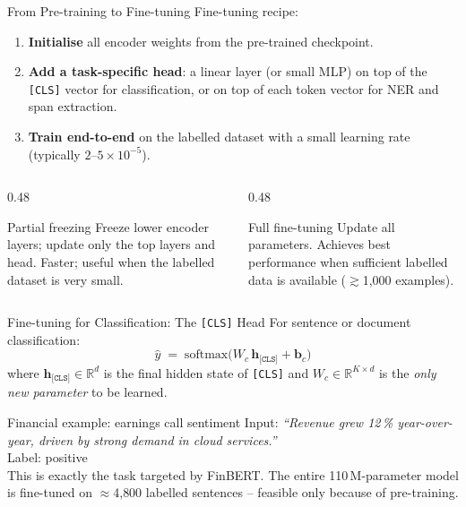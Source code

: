 \documentclass[11pt,aspectratio=169,professionalfonts]{beamer}
\begin{document}
\begin{frame}{From Pre-training to Fine-tuning}
  Fine-tuning recipe:
  \begin{enumerate}
    \item \textbf{Initialise} all encoder weights from the pre-trained checkpoint.
    \item \textbf{Add a task-specific head}: a linear layer (or small MLP)
          on top of the \texttt{[CLS]} vector for classification,
          or on top of each token vector for NER and span extraction.
    \item \textbf{Train end-to-end} on the labelled dataset with a
          small learning rate (typically $2$--$5\times10^{-5}$).
  \end{enumerate}

  \begin{columns}[T]
    \begin{column}{0.48\linewidth}
      \begin{block}{Partial freezing}
        Freeze lower encoder layers; update only the top layers and head.
        Faster; useful when the labelled dataset is very small.
      \end{block}
    \end{column}
    \begin{column}{0.48\linewidth}
      \begin{block}{Full fine-tuning}
        Update all parameters.  Achieves best performance when
        sufficient labelled data is available
        ($\gtrsim$1{,}000 examples).
      \end{block}
    \end{column}
  \end{columns}
\end{frame}
%
%
\begin{frame}{Fine-tuning for Classification: The \texttt{[CLS]} Head}
  For sentence or document classification:
  \[
    \hat{y} \;=\; \mathrm{softmax}\!\bigl(W_c\,\mathbf{h}_{\texttt{[CLS]}}
                                    + \mathbf{b}_c\bigr)
  \]
  where $\mathbf{h}_{\texttt{[CLS]}}\in\mathbb{R}^{d}$ is the final hidden
  state of \texttt{[CLS]} and $W_c\in\mathbb{R}^{K\times d}$ is the
  \emph{only new parameter} to be learned.

  \medskip
  \begin{exampleblock}{Financial example: earnings call sentiment}
    Input: \emph{``Revenue grew 12\,\% year-over-year,
    driven by strong demand in cloud services.''}\\
    Label: positive\\[0.2em]
    This is exactly the task targeted by FinBERT.
    The entire 110\,M-parameter model is fine-tuned on
    $\approx$4{,}800 labelled sentences -- feasible only because of pre-training.
  \end{exampleblock}
\end{frame}
\end{document}
